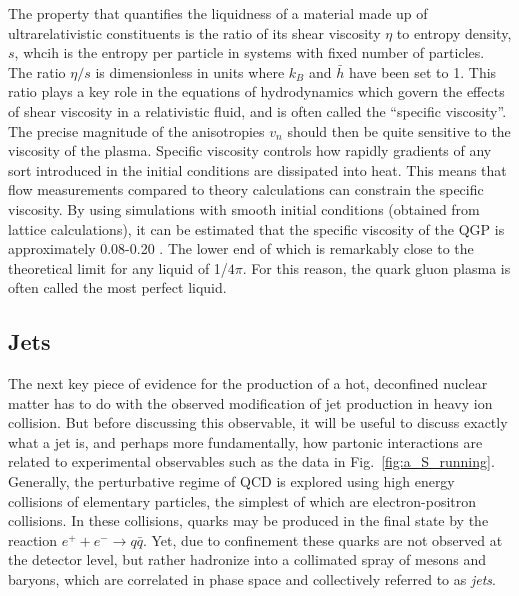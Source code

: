   The property that quantifies the liquidness of a material made up of ultrarelativistic constituents is the ratio of its shear viscosity $\eta$ to entropy density, $s$, whcih is the entropy per particle in systems with fixed number of particles. The ratio $\eta/s$ is dimensionless in units where $k_B$ and $\bar{h}$ have been set to 1. This ratio plays a key role in the equations of hydrodynamics which govern the effects of shear viscosity in a relativistic fluid, and is often called the ``specific viscosity''. The precise magnitude of the anisotropies $v_n$ should then be quite sensitive to the viscosity of the plasma. Specific viscosity controls how rapidly gradients of any sort introduced in the initial conditions are dissipated into heat. This means that flow measurements compared to theory calculations can constrain the specific viscosity. By using simulations with smooth initial conditions (obtained from lattice calculations),  it can be estimated that the specific viscosity of the QGP is approximately 0.08-0.20 \cite{Romatschke2007}. The lower end of which is remarkably close to the theoretical limit for any liquid of 1/$4\pi$. For this reason, the quark gluon plasma is often called the most perfect liquid.



\subsection{Jets}
The next key piece of evidence for the production of a hot, deconfined nuclear matter has to do with the observed modification of jet production in heavy ion collision. But before discussing this observable, it will be useful to discuss exactly what a jet is, and perhaps more fundamentally, how partonic interactions are related to experimental observables such as the data in Fig.~\ref{fig:a_S_running}. Generally, the perturbative regime of QCD is explored using high energy collisions of elementary particles, the simplest of which are electron-positron collisions. In these collisions, quarks may be produced in the final state by the reaction $e^++e^- \rightarrow q\bar{q}$. Yet, due to confinement these quarks are not observed at the detector level, but rather hadronize into a collimated spray of mesons and baryons, which are correlated in phase space and collectively referred to as \textit{jets}. 

